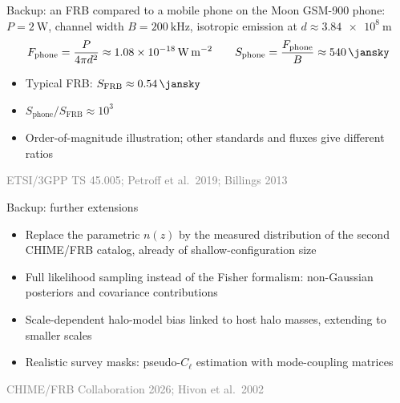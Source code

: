 \documentclass[aspectratio=1610, 10pt]{beamer}
\newcommand{\source}[1]{{\par\hfill\tiny\textcolor{gray}{#1}\par}}
\begin{document}
\begin{frame}{Backup: an FRB compared to a mobile phone on the Moon}
  GSM-900 phone: $P = \qty{2}{\watt}$, channel width $B = \qty{200}{\kilo\hertz}$,
  isotropic emission at $d \approx \qty{3.84e8}{\metre}$
  \begin{equation*}
    F_{\mathrm{phone}} = \frac{P}{4\pi d^2} \approx \qty{1.08e-18}{\watt\per\square\metre}
    \qquad
    S_{\mathrm{phone}} = \frac{F_{\mathrm{phone}}}{B} \approx \qty{540}{\jansky}
  \end{equation*}
  \begin{itemize}
    \item Typical FRB: $S_{\mathrm{FRB}} \approx \qty{0.54}{\jansky}$
    \item $S_{\mathrm{phone}} / S_{\mathrm{FRB}} \approx 10^{3}$
    \item Order-of-magnitude illustration; other standards and fluxes give different ratios
  \end{itemize}
  \source{ETSI/3GPP TS 45.005; Petroff et al.\ 2019; Billings 2013}
\end{frame}

\begin{frame}{Backup: further extensions}
  \begin{itemize}
    \item Replace the parametric $n(z)$ by the measured distribution of the second CHIME/FRB catalog,
      already of shallow-configuration size
    \item Full likelihood sampling instead of the Fisher formalism:
      non-Gaussian posteriors and covariance contributions
    \item Scale-dependent halo-model bias linked to host halo masses, extending to smaller scales
    \item Realistic survey masks: pseudo-$C_\ell$ estimation with mode-coupling matrices
  \end{itemize}
  \source{CHIME/FRB Collaboration 2026; Hivon et al.\ 2002}
\end{frame}
\end{document}
